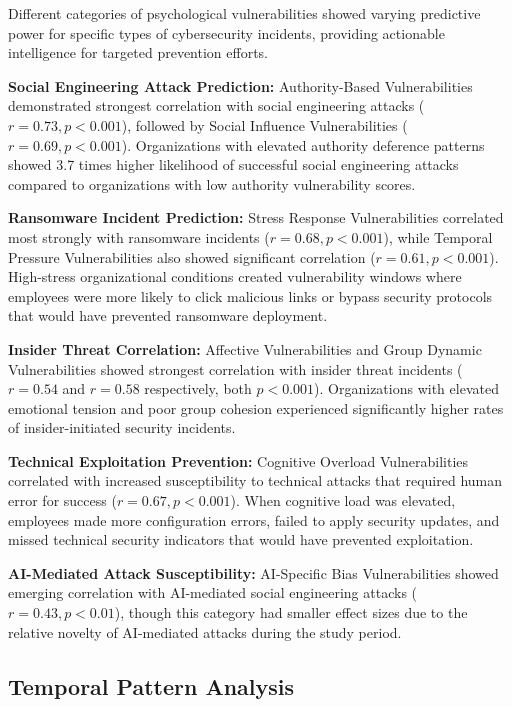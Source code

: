 \documentclass[10pt, twocolumn]{article}
\begin{document}
Different categories of psychological vulnerabilities showed varying predictive power for specific types of cybersecurity incidents, providing actionable intelligence for targeted prevention efforts.

\textbf{Social Engineering Attack Prediction:} Authority-Based Vulnerabilities demonstrated strongest correlation with social engineering attacks ($r = 0.73, p < 0.001$), followed by Social Influence Vulnerabilities ($r = 0.69, p < 0.001$). Organizations with elevated authority deference patterns showed 3.7 times higher likelihood of successful social engineering attacks compared to organizations with low authority vulnerability scores.

\textbf{Ransomware Incident Prediction:} Stress Response Vulnerabilities correlated most strongly with ransomware incidents ($r = 0.68, p < 0.001$), while Temporal Pressure Vulnerabilities also showed significant correlation ($r = 0.61, p < 0.001$). High-stress organizational conditions created vulnerability windows where employees were more likely to click malicious links or bypass security protocols that would have prevented ransomware deployment.

\textbf{Insider Threat Correlation:} Affective Vulnerabilities and Group Dynamic Vulnerabilities showed strongest correlation with insider threat incidents ($r = 0.54$ and $r = 0.58$ respectively, both $p < 0.001$). Organizations with elevated emotional tension and poor group cohesion experienced significantly higher rates of insider-initiated security incidents.

\textbf{Technical Exploitation Prevention:} Cognitive Overload Vulnerabilities correlated with increased susceptibility to technical attacks that required human error for success ($r = 0.67, p < 0.001$). When cognitive load was elevated, employees made more configuration errors, failed to apply security updates, and missed technical security indicators that would have prevented exploitation.

\textbf{AI-Mediated Attack Susceptibility:} AI-Specific Bias Vulnerabilities showed emerging correlation with AI-mediated social engineering attacks ($r = 0.43, p < 0.01$), though this category had smaller effect sizes due to the relative novelty of AI-mediated attacks during the study period.

\subsection{Temporal Pattern Analysis}
\end{document}
